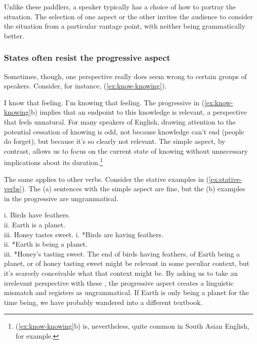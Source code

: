 Unlike these paddlers, a speaker typically has a choice of how to portray the situation. The selection of one aspect or the other invites the audience to consider the situation from a particular vantage point, with neither being grammatically better.

\subsubsection{States often resist the progressive aspect}\label{sec:statives-resist}
Sometimes, though, one perspective really does seem wrong to certain groups of speakers. Consider, for instance, (\ref{ex:know-knowing}).

\ea \label{ex:know-knowing}
\ea I know that feeling.
\ex *I'm knowing that feeling.
\z\z
The progressive in (\ref{ex:know-knowing}b) implies that an endpoint to this knowledge is relevant, a perspective that feels unnatural. For many speakers of English, drawing attention to the potential cessation of knowing is odd, not because knowledge can't end (people do forget), but because it's so clearly not relevant. The simple aspect, by contrast, allows us to focus on the current state of knowing without unnecessary implications about its duration.\footnote{(\ref{ex:know-knowing}b) is, nevertheless, quite common in South Asian English, for example.}

The same applies to other verbs. Consider the stative examples in (\ref{ex:stative-verbs}). The (a) sentences with the simple aspect are fine, but the (b) examples in the progressive are ungrammatical.

\ea\label{ex:stative-verbs}
\ea \textnormal{i.} Birds have feathers. \\ \textnormal{ii.} Earth is a planet. \\ \textnormal{iii.} Honey tastes sweet.
\ex \textnormal{i.} *Birds are having feathers. \\ \textnormal{ii.} *Earth is being a planet. \\ \textnormal{iii.} *Honey's tasting sweet.
\z\z
The end of birds having feathers, of Earth being a planet, or of honey tasting sweet might be relevant in some peculiar context, but it's scarcely conceivable what that context might be. By asking us to take an irrelevant perspective with these , the progressive aspect creates a linguistic mismatch and registers as ungrammatical. If Earth is only being a planet for the time being, we have probably wandered into a different textbook.

